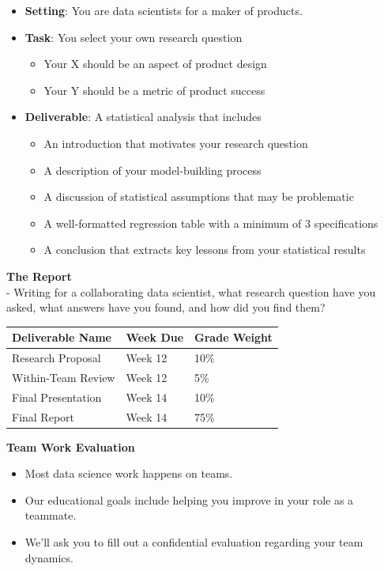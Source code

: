 \documentclass[
]{book}
\providecommand{\tightlist}{%
  \setlength{\itemsep}{0pt}\setlength{\parskip}{0pt}}
\theoremstyle{definition}
\theoremstyle{definition}
\theoremstyle{definition}
\theoremstyle{definition}
\theoremstyle{remark}
\begin{document}
\begin{itemize}
\tightlist
\item
  \textbf{Setting}: You are data scientists for a maker of products.
\item
  \textbf{Task}: You select your own research question

  \begin{itemize}
  \tightlist
  \item
    Your X should be an aspect of product design
  \item
    Your Y should be a metric of product success
  \end{itemize}
\item
  \textbf{Deliverable}: A statistical analysis that includes

  \begin{itemize}
  \tightlist
  \item
    An introduction that motivates your research question
  \item
    A description of your model-building process
  \item
    A discussion of statistical assumptions that may be problematic
  \item
    A well-formatted regression table with a minimum of 3 specifications
  \item
    A conclusion that extracts key lessons from your statistical results
  \end{itemize}
\end{itemize}

\textbf{The Report}\\
- Writing for a collaborating data scientist, what research question have you asked, what answers have you found, and how did you find them?

\begin{longtable}[]{@{}lll@{}}
\toprule
Deliverable Name & Week Due & Grade Weight \\
\midrule
\endhead
Research Proposal & Week 12 & 10\% \\
Within-Team Review & Week 12 & 5\% \\
Final Presentation & Week 14 & 10\% \\
Final Report & Week 14 & 75\% \\
\bottomrule
\end{longtable}

\textbf{Team Work Evaluation}

\begin{itemize}
\tightlist
\item
  Most data science work happens on teams.
\item
  Our educational goals include helping you improve in your role as a teammate.
\item
  We'll ask you to fill out a confidential evaluation regarding your team dynamics.
\end{itemize}
\end{document}
